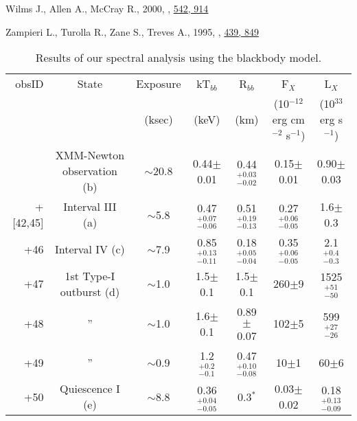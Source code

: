 \documentclass[a4paper,fleqn,usenatbib]{mnras}
\begin{document}
\begin{thebibliography}{}
{Wilms} J.,  {Allen} A.,   {McCray} R.,  2000, ,
  \href {http://adsabs.harvard.edu/abs/2000ApJ...542..914W} {542, 914}

{Zampieri} L.,  {Turolla} R.,  {Zane} S.,   {Treves} A.,  1995, , \href {http://adsabs.harvard.edu/abs/1995ApJ...439..849Z}
  {439, 849}

\makeatother
\end{thebibliography}

\begin{table*}
	\begin{center}
	\small
	\caption{Results of our spectral analysis using the blackbody model.}
	\label{tab:Table1}
	\begin{threeparttable}
	\begin{tabular}{ | r | c | c | c | c | c | c |}	
		\hline
		obsID & State & Exposure & kT$_{bb}$ & R$_{bb}$ & F$_{X}$ & L$_{X} $\\
		  &  & (ksec) & (keV) & (km) & (10$^{-12}$ erg cm$^{-2}$ s$^{-1}$) & (10$^{33}$ erg s$^{-1}$)\\
		\hline
		\smallskip
		0790180301 & XMM-Newton observation (b) & $\sim$20.8 & 0.44$\pm$0.01 & 0.44$^{+0.03}_{-0.02}$ & 0.15$\pm$0.01 & 0.90$\pm$0.03\\	
		\smallskip
		000311720+[42,45] & Interval III (a) & $\sim$5.8 & 0.47$^{+0.07}_{-0.06}$ & 0.51$^{+0.19}_{-0.13}$ & 0.27$^{+0.06}_{-0.05}$ & 1.6$\pm$0.3\\
		\smallskip
		+46 & Interval IV (c) & $\sim$7.9 & 0.85$^{+0.13}_{-0.11}$ & 0.18$^{+0.05}_{-0.04}$ & 0.35$^{+0.06}_{-0.05}$ & 2.1$^{+0.4}_{-0.3}$\\
		\smallskip
		+47 & 1st Type-I outburst (d) & $\sim$1.0 & 1.5$\pm$0.1 & 1.5$\pm$0.1 & 260$\pm$9 & 1525$^{+51}_{-50}$\\
		\smallskip		
		+48 & '' & $\sim$1.0 & 1.6$\pm$0.1 & 0.89$\pm$0.07 & 102$\pm$5 & 599$^{+27}_{-26}$\\
		\smallskip
		+49 & '' & $\sim$0.9 & 1.2$^{+0.2}_{-0.1}$ & 0.47$^{+0.10}_{-0.08}$ & 10$\pm$1 & 60$\pm$6\\
		\smallskip
		+50 & Quiescence I (e) & $\sim$8.8 & 0.36$^{+0.04}_{-0.05}$ & 0.3$^*$ & 0.03$\pm$0.02 & 0.18$^{+0.13}_{-0.09}$\\

\end{tabular}
\end{threeparttable}
\end{center}
\end{table*}
\end{document}
